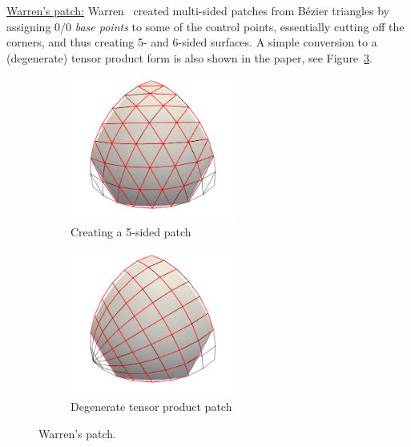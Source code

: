 \documentclass{article}
\begin{document}
\vspace{10pt}
\noindent\underline{Warren's patch:}\vspace{0.2em}\newline
Warren~\cite{warren} created multi-sided patches from B\'ezier triangles by assigning $0/0$
\emph{base points} to some of the control points, essentially cutting off the corners, and thus
creating 5- and 6-sided surfaces. A simple conversion to a (degenerate) tensor product form is
also shown in the paper, see Figure~\ref{fig:warren}.
\begin{figure}
  \begin{subfigure}{0.45\textwidth}
    \centering
    \includegraphics[width = 0.6\textwidth]{images/warren-cnet.png}
    \caption{Creating a 5-sided patch}
    \label{fig:warren-cnet}
  \end{subfigure}
  \begin{subfigure}{0.45\textwidth}
    \centering
    \includegraphics[width = 0.6\textwidth]{images/warren-quad.png}
    \caption{Degenerate tensor product patch}
    \label{fig:warren-quad}
  \end{subfigure}
  \caption{Warren's patch.}
  \label{fig:warren}
\end{figure}
\end{document}
